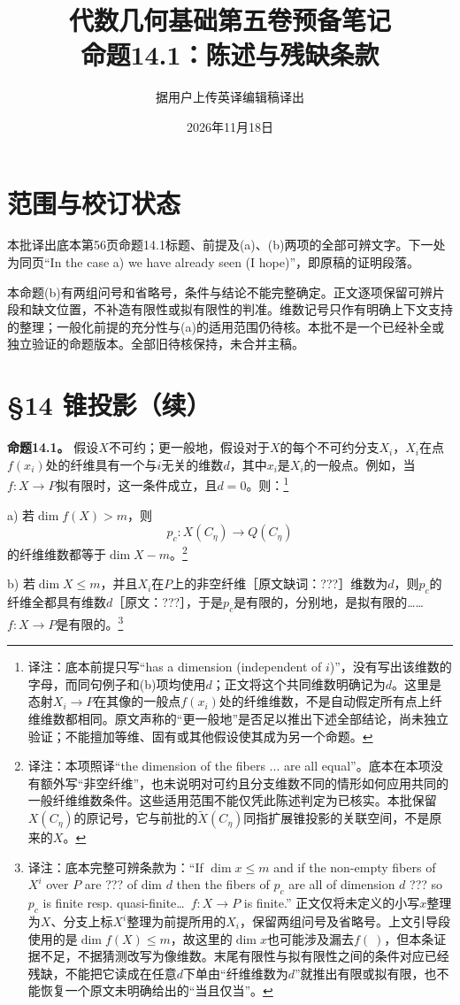\documentclass[openany,fontset=fandol]{ctexbook}
\newcommand{\note}[1]{\footnote{译注：#1}}
\begin{document}
\title{代数几何基础第五卷预备笔记\\命题14.1：陈述与残缺条款}
\author{据用户上传英译编辑稿译出}
\date{2026年11月18日}
\maketitle
\chapter*{范围与校订状态}
本批译出底本第56页命题14.1标题、前提及(a)、(b)两项的全部可辨文字。下一处为同页“In the case a) we have already seen (I hope)”，即原稿的证明段落。

本命题(b)有两组问号和省略号，条件与结论不能完整确定。正文逐项保留可辨片段和缺文位置，不补造有限性或拟有限性的判准。维数记号只作有明确上下文支持的整理；一般化前提的充分性与(a)的适用范围仍待核。本批不是一个已经补全或独立验证的命题版本。全部旧待核保持，未合并主稿。
\chapter*{§14 锥投影（续）}
\noindent\textbf{命题14.1。}
假设$X$不可约；更一般地，假设对于$X$的每个不可约分支$X_i$，$X_i$在点$f(x_i)$处的纤维具有一个与$i$无关的维数$d$，其中$x_i$是$X_i$的一般点。例如，当$f:X\to P$拟有限时，这一条件成立，且$d=0$。则：\note{底本前提只写“has a dimension (independent of $i$)”，没有写出该维数的字母，而同句例子和(b)项均使用$d$；正文将这个共同维数明确记为$d$。这里是态射$X_i\to P$在其像的一般点$f(x_i)$处的纤维维数，不是自动假定所有点上纤维维数都相同。原文声称的“更一般地”是否足以推出下述全部结论，尚未独立验证；不能擅加等维、固有或其他假设使其成为另一个命题。}

\noindent a) 若$\dim f(X)>m$，则
\[
p_c:X(C_\eta)\longrightarrow Q(C_\eta)
\]
的纤维维数都等于$\dim X-m$。\note{本项照译“the dimension of the fibers ... are all equal”。底本在本项没有额外写“非空纤维”，也未说明对可约且分支维数不同的情形如何应用共同的一般纤维维数条件。这些适用范围不能仅凭此陈述判定为已核实。本批保留$X(C_\eta)$的原记号，它与前批的$\widetilde X(C_\eta)$同指扩展锥投影的关联空间，不是原来的$X$。}

\noindent b) 若$\dim X\leq m$，并且$X_i$在$P$上的非空纤维［原文缺词：???］维数为$d$，则$p_c$的纤维全都具有维数$d$［原文：???］，于是$p_c$是有限的，分别地，是拟有限的……$f:X\to P$是有限的。\note{底本完整可辨条款为：“If $\dim x\leq m$ and if the non-empty fibers of $X^i$ over $P$ are ??? of dim $d$ then the fibers of $p_c$ are all of dimension $d$ ??? so $p_c$ is finite resp. quasi-finite\ldots\ $f:X\to P$ is finite.” 正文仅将未定义的小写$x$整理为$X$、分支上标$X^i$整理为前提所用的$X_i$，保留两组问号及省略号。上文引导段使用的是$\dim f(X)\leq m$，故这里的$\dim x$也可能涉及漏去$f(\ )$，但本条证据不足，不据猜测改写为像维数。末尾有限性与拟有限性之间的条件对应已经残缺，不能把它读成在任意$d$下单由“纤维维数为$d$”就推出有限或拟有限，也不能恢复一个原文未明确给出的“当且仅当”。}
\end{document}
